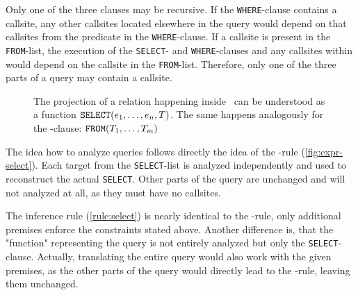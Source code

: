 Only one of the three clauses may be recursive. If the \texttt{WHERE}-clause contains a callsite, any other callsites located elsewhere in the query would depend on that callsites from the predicate in the \texttt{WHERE}-clause. If a callsite is present in the \texttt{FROM}-list, the execution of the \texttt{SELECT}- and \texttt{WHERE}-clauses and any callsites within would depend on the callsite in the \texttt{FROM}-list. Therefore, only one of the three parts of a query may contain a callsite.

\begin{figure}[h!]
    \centering
    
    \caption{The projection of a relation happening inside \SELECT~can be understood as a function $\text{\texttt{SELECT}}(e_1, \dots, e_n, T)$. The same happens analogously for the \FROM-clause: $\text{\texttt{FROM}}(T_1, \dots, T_m)$}
    \label{fig:expr-select}
\end{figure}

The idea how to analyze queries follows directly the idea of the \REXPR-rule (\autoref{fig:expr-select}). Each target from the \texttt{SELECT}-list is analyzed independently and used to reconstruct the actual \texttt{SELECT}. Other parts of the query are unchanged and will not analyzed at all, as they must have no callsites.

The inference rule (\autoref{rule:select}) is nearly identical to the \REXPR-rule, only additional premises enforce the constraints stated above. Another difference is, that the "function" representing the query is not entirely analyzed but only the \texttt{SELECT}-clause. Actually, translating the entire query would also work with the given premises, as the other parts of the query would directly lead to the \RBASE-rule, leaving them unchanged.

